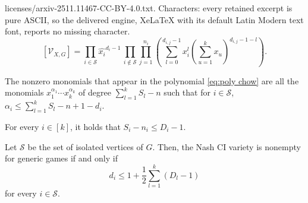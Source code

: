 \documentclass[10pt,a4paper]{amsart}
\newcommand{\Vc}{{\mathcal V}_{X,G}}
\begin{document}
licenses/arxiv-2511.11467-CC-BY-4.0.txt. Characters: every retained excerpt is pure ASCII, so the delivered engine, XeLaTeX with its default Latin Modern text font, reports no missing character.
    \begin{equation}
        \label{eq:poly chow}
        [\Vc]= \displaystyle\prod_{i\in\mathcal S}  \widehat{x_i}^{d_i-1} \,\prod_{i\not\in\mathcal S}\prod_{j=1}^{n_i}\left(    
        \sum_{l=0}^{d_{i,j}-1} x_i^l\left(\sum_{u=1}^kx_u\right)^{d_{i,j}-1-l}
        \right).
    \end{equation}

\begin{lemma}\label{lemma: monomials}
    The nonzero monomials that appear in the polynomial \eqref{eq:poly chow} are all the monomials $x_1^{\alpha_1}\cdots x_k^{\alpha_k}$ of degree $\displaystyle\sum_{l=1}^k S_l-n$ such that for $i\in\mathcal S$, $\displaystyle\alpha_i\leq \sum_{l=1}^kS_l -n+1-d_i$.
\end{lemma}

\begin{lemma}\label{lemma: inequality ds}
    For every $i\in[k]$, it holds that $S_i-n_i\le D_i-1$.
\end{lemma}

\begin{theorem}\label{theo:emptyness}
    Let $\mathcal S$ be the set of isolated vertices of $G$. Then, the Nash CI variety is nonempty for generic games if and only if
    \begin{equation}\label{eq: final nonempty}
    d_i\leq1+\frac12 \sum_{l=1}^k(D_l-1)
    \end{equation}
    for every $i\in\mathcal S$.
\end{theorem}
\end{document}

